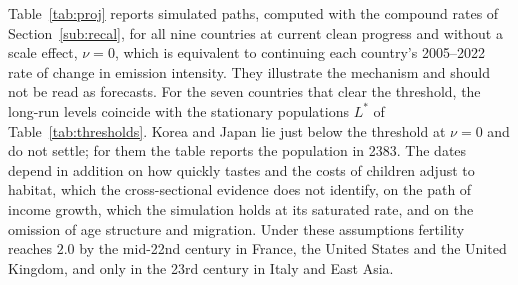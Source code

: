 \documentclass[11pt]{article}
\begin{document}
Table~\ref{tab:proj} reports simulated paths, computed with the compound rates of
Section~\ref{sub:recal}, for all nine countries at current clean progress and without
a scale effect, $\nu=0$, which is equivalent to continuing each country's 2005--2022 rate of change in emission
intensity. They illustrate the mechanism and should not be read as forecasts. For the seven countries that clear the threshold, the long-run levels coincide with the stationary
populations $L^\ast$ of Table~\ref{tab:thresholds}. Korea and Japan lie just below the threshold at
$\nu=0$ and do not settle; for them the table reports the population in 2383. The dates depend in addition on how quickly tastes and the
costs of children adjust to habitat, which the cross-sectional evidence does not identify, on the path of
income growth, which the simulation holds at its saturated rate, and on the omission of age structure and
migration. Under these assumptions fertility reaches $2.0$ by the mid-22nd century in France, the United
States and the United Kingdom, and only in the 23rd century in Italy and East Asia.
\end{document}
